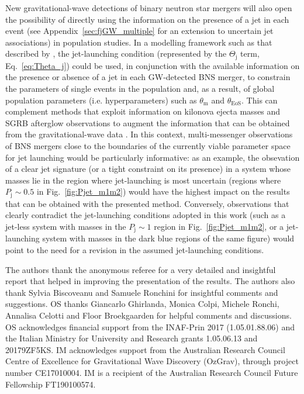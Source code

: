 \documentclass[]{aa}
\newcommand{\resp}[1]{#1}
\begin{document}
New gravitational-wave detections of binary neutron star mergers will also open the possibility of directly using the information on the presence of a jet in each event (see Appendix~\ref{sec:fjGW_multiple} for an extension to uncertain jet associations) in population studies. In a modelling framework such as that described by \cite{Mandel2019}, \resp{the jet-launching condition (represented by the $\Theta_\mathrm{j}$ term, Eq.~\ref{eq:Theta_j}) could be used, in conjunction with the available information on the presence or absence of a jet in each GW-detected BNS merger, to constrain the parameters of single events in the population and, as a result, of global population parameters (i.e. hyperparameters) such as $\theta_\mathrm{m}$ and $\theta_\mathrm{EoS}$.} This can complement methods that exploit information on kilonova ejecta masses \citep{Li1998,Metzger2019} and SGRB afterglow observations \resp{to augment the information that can be obtained from the} gravitational-wave data \citep[e.g.][]{Hotokezaka2019,Radice2019,Lazzati2019,Barbieri2019,Coughlin2019,Dietrich2020,Breschi2021,Raaijmakers2021_GW190425}. \resp{In this context, multi-messenger observations of BNS mergers close to the boundaries of the currently viable parameter space for jet launching would be particularly informative: as an example, the obsevation of a clear jet signature (or a tight constraint on its presence) in a system whose masses lie in the region where jet-launching is most uncertain (regions where $P_\mathrm{j}\sim 0.5$ in Fig.~\ref{fig:Pjet_m1m2}) would have the highest impact on the results that can be obtained with the presented method. Conversely, observations that clearly contradict the jet-launching conditions adopted in this work (such as a jet-less system with masses in the $P_\mathrm{j}\sim 1$ region in Fig.~\ref{fig:Pjet_m1m2}, or a jet-launching system with masses in the dark blue regions of the same figure) would point to the need for a revision in the assumed jet-launching conditions}.  %


\begin{acknowledgements} The authors thank the anonymous referee for a very detailed and insightful report that helped in improving the presentation of the results. The authors also thank Sylvia Biscoveanu and Samuele Ronchini for insightful comments and suggestions. OS thanks Giancarlo Ghirlanda, Monica Colpi, Michele Ronchi, Annalisa Celotti and Floor Broekgaarden for helpful comments and discussions. OS acknowledges financial support from the INAF-Prin 2017 (1.05.01.88.06) and the Italian Ministry for University and Research grants 1.05.06.13 and 20179ZF5KS. IM acknowledges support from the Australian Research Council Centre of Excellence for Gravitational  Wave  Discovery  (OzGrav), through project number CE17010004.  IM is a recipient of the Australian Research Council Future Fellowship FT190100574.  
\end{acknowledgements}
\end{document}
